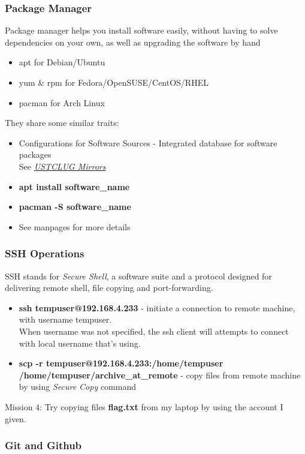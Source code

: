 \documentclass[11pt]{beamer}
\begin{document}
\begin{frame}
\frametitle{Package Manager}
Package manager helps you install software easily, without having to solve dependencies on your own, as well as upgrading the software by hand
\begin{itemize}
\item apt for Debian/Ubuntu
\item yum \& rpm for Fedora/OpenSUSE/CentOS/RHEL
\item pacman for Arch Linux
\end{itemize}
They share some similar traits:
\begin{itemize}
\item Configurations for Software Sources - Integrated database for software packages\\
See \textit{\href{http://mirrors.ustc.edu.cn}{USTCLUG Mirrors}}
\item \textbf{apt install software\_name}
\item \textbf{pacman -S software\_name}
\item See manpages for more details
\end{itemize}
\end{frame}

\begin{frame}
\frametitle{SSH Operations}
SSH stands for \textit{Secure Shell}, a software suite and a protocol designed for delivering remote shell, file copying and port-forwarding.
\begin{itemize}
\item \textbf{ssh tempuser@192.168.4.233} - initiate a connection to remote machine, with username tempuser.\\
When username was not specified, the ssh client will attempts to connect with local username that's using.
\item \textbf{scp -r tempuser@192.168.4.233:/home/tempuser /home/tempuser/archive\_at\_remote} - copy files from remote machine by using \textit{Secure Copy} command
\end{itemize}

Mission 4: Try copying files \textbf{flag.txt} from my laptop by using the account I given.
\end{frame}

\begin{frame}
\frametitle{Git and Github}


\end{frame}
\end{document}
